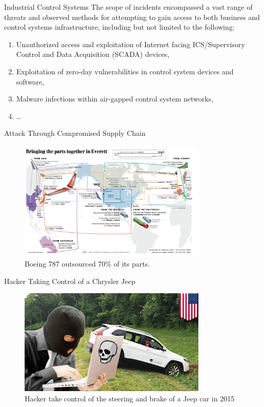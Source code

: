 \documentclass[10pt]{beamer}
\begin{document}
\begin{frame}{Industrial Control Systems}
  The scope of incidents encompassed a vast range of threats and observed methods for attempting to gain access to both business and control systems infrastructure, including but not limited to the following:
  \begin{enumerate}
    \item  Unauthorized access and exploitation of Internet facing ICS/Supervisory Control and Data Acquisition (SCADA) devices,
    \item  Exploitation of zero-day vulnerabilities in control system devices and software, 
    \item  Malware infections within air-gapped control system networks,
    \item \dots
  \end{enumerate}
\end{frame}

\begin{frame}{Attack Through Compromised Supply Chain}
  \begin{figure}[ht]
    \centering
    \includegraphics[width=0.8\textwidth]{boeing.jpg}
    \caption{Boeing 787 outsourced 70\% of its parts.}
  \end{figure}
\end{frame}

\begin{frame}{Hacker Taking Control of a Chrysler Jeep}
  \begin{figure}[<+htpb+>]
    \begin{center}
      \includegraphics[width=0.80\textwidth]{jeep.jpg}
      \caption{Hacker take control of the steering and brake of a Jeep car in 2015}
    \end{center}
  \end{figure}
\end{frame}
\end{document}
